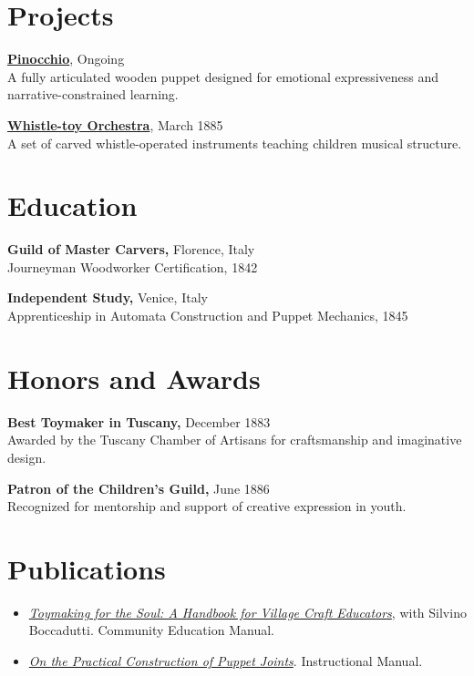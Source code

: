 \documentclass[10pt]{article}
\begin{document}
\section*{Projects}

\textbf{\href{https://en.wikipedia.org/wiki/Pinocchio}{Pinocchio}}, \hfill Ongoing \\
A fully articulated wooden puppet designed for emotional expressiveness and narrative-constrained learning.
 \\
\vspace{0.3em}

\textbf{\href{}{Whistle-toy Orchestra}}, \hfill March 1885 \\
A set of carved whistle-operated instruments teaching children musical structure.
 \\
\vspace{0.3em}


\section*{Education}

\textbf{Guild of Master Carvers, } \hfill Florence, Italy \\
Journeyman Woodworker Certification, \hfill 1842
\vspace{0.3em}

\textbf{Independent Study, } \hfill Venice, Italy \\
Apprenticeship in Automata Construction and Puppet Mechanics, \hfill 1845
\vspace{0.3em}


\section*{Honors and Awards}

\textbf{Best Toymaker in Tuscany,} \hfill December 1883 \\
Awarded by the Tuscany Chamber of Artisans for craftsmanship and imaginative design.
\vspace{0.3em}

\textbf{Patron of the Children's Guild,} \hfill June 1886 \\
Recognized for mentorship and support of creative expression in youth.
\vspace{0.3em}


\section*{Publications}
\begin{itemize}[leftmargin=*, noitemsep, topsep=0.1em]

    \item \textit{\href{}{Toymaking for the Soul: A Handbook for Village Craft Educators}}, with Silvino Boccadutti. Community Education Manual.

    \item \textit{\href{}{On the Practical Construction of Puppet Joints}}. Instructional Manual.

\end{itemize}
\end{document}
